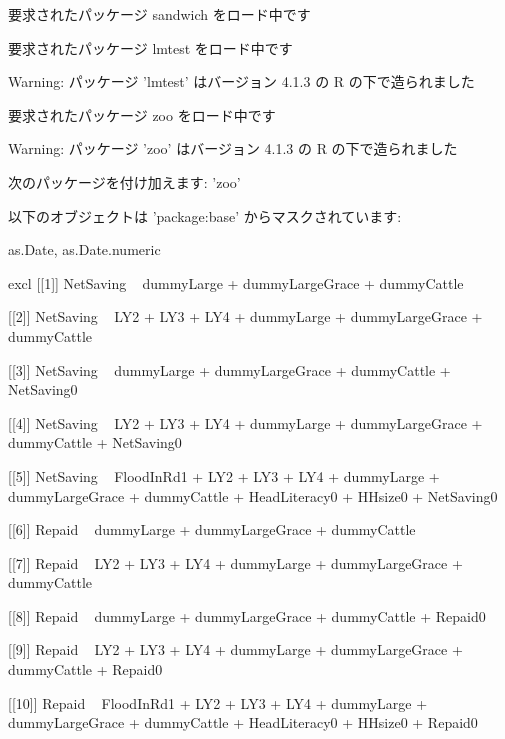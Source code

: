\begin{Schunk}
\begin{Soutput}
 要求されたパッケージ sandwich をロード中です 
\end{Soutput}
\begin{Soutput}
 要求されたパッケージ lmtest をロード中です 
\end{Soutput}
\begin{Soutput}
Warning:  パッケージ 'lmtest' はバージョン 4.1.3 の R の下で造られました 
\end{Soutput}
\begin{Soutput}
 要求されたパッケージ zoo をロード中です 
\end{Soutput}
\begin{Soutput}
Warning:  パッケージ 'zoo' はバージョン 4.1.3 の R の下で造られました 
\end{Soutput}
\begin{Soutput}

 次のパッケージを付け加えます: 'zoo' 
\end{Soutput}
\begin{Soutput}
 以下のオブジェクトは 'package:base' からマスクされています: 

     as.Date, as.Date.numeric 
\end{Soutput}
\begin{Soutput}
[1] excl
[[1]]
NetSaving ~ dummyLarge + dummyLargeGrace + dummyCattle

[[2]]
NetSaving ~ LY2 + LY3 + LY4 + dummyLarge + dummyLargeGrace + 
    dummyCattle

[[3]]
NetSaving ~ dummyLarge + dummyLargeGrace + dummyCattle + NetSaving0

[[4]]
NetSaving ~ LY2 + LY3 + LY4 + dummyLarge + dummyLargeGrace + 
    dummyCattle + NetSaving0

[[5]]
NetSaving ~ FloodInRd1 + LY2 + LY3 + LY4 + dummyLarge + dummyLargeGrace + 
    dummyCattle + HeadLiteracy0 + HHsize0 + NetSaving0

[[6]]
Repaid ~ dummyLarge + dummyLargeGrace + dummyCattle

[[7]]
Repaid ~ LY2 + LY3 + LY4 + dummyLarge + dummyLargeGrace + dummyCattle

[[8]]
Repaid ~ dummyLarge + dummyLargeGrace + dummyCattle + Repaid0

[[9]]
Repaid ~ LY2 + LY3 + LY4 + dummyLarge + dummyLargeGrace + dummyCattle + 
    Repaid0

[[10]]
Repaid ~ FloodInRd1 + LY2 + LY3 + LY4 + dummyLarge + dummyLargeGrace + 
    dummyCattle + HeadLiteracy0 + HHsize0 + Repaid0


\end{Soutput}
\end{Schunk}

